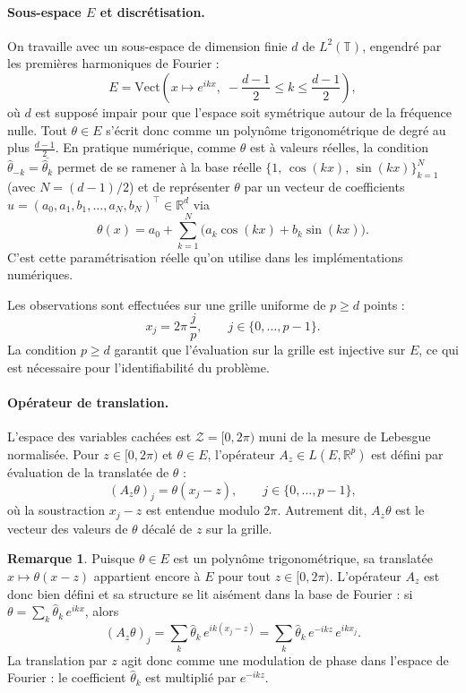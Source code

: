 \documentclass[12pt, a4paper]{article}
\theoremstyle{definition}
\newtheorem{remark}[theorem]{Remarque}
\newcommand{\R}{\mathbb{R}}
\newcommand{\Zcal}{\mathcal{Z}}
\begin{document}
\paragraph{Sous-espace $E$ et discrétisation.}
On travaille avec un sous-espace de dimension finie $d$ de $L^2(\mathbb{T})$,
engendré par les premières harmoniques de Fourier :
\[
    E = \mathrm{Vect}\!\left(x \mapsto e^{ikx},\;
    -\frac{d-1}{2} \leq k \leq \frac{d-1}{2}\right),
\]
où $d$ est supposé impair pour que l'espace soit symétrique autour de la fréquence
nulle. Tout $\theta \in E$ s'écrit donc comme un polynôme trigonométrique de degré
au plus $\frac{d-1}{2}$.
En pratique numérique, comme $\theta$ est à valeurs réelles, la condition
$\hat\theta_{-k} = \overline{\hat\theta_k}$ permet de se ramener à la base réelle
$\bigl\{1,\,\cos(kx),\,\sin(kx)\bigr\}_{k=1}^{N}$ (avec $N = (d-1)/2$) et de
représenter $\theta$ par un vecteur de coefficients
$u = (a_0, a_1, b_1, \ldots, a_N, b_N)^\top \in \R^d$ via
\[
    \theta(x) = a_0 + \sum_{k=1}^{N}\bigl(a_k\cos(kx) + b_k\sin(kx)\bigr).
\]
C'est cette paramétrisation réelle qu'on utilise dans les implémentations numériques.

Les observations sont effectuées sur une grille uniforme de $p \geq d$ points :
\[
    x_j = 2\pi\,\frac{j}{p}, \qquad j \in \{0, \ldots, p-1\}.
\]
La condition $p \geq d$ garantit que l'évaluation sur la grille est injective
sur $E$, ce qui est nécessaire pour l'identifiabilité du problème.

\paragraph{Opérateur de translation.}
L'espace des variables cachées est $\Zcal = [0, 2\pi)$ muni de la mesure de
Lebesgue normalisée. Pour $z \in [0, 2\pi)$ et $\theta \in E$, l'opérateur
$A_z \in L(E, \R^p)$ est défini par évaluation de la translatée de $\theta$ :
\[
    (A_z\theta)_j = \theta(x_j - z), \qquad j \in \{0, \ldots, p-1\},
\]
où la soustraction $x_j - z$ est entendue modulo $2\pi$. Autrement dit, $A_z\theta$
est le vecteur des valeurs de $\theta$ décalé de $z$ sur la grille.

\begin{remark}
    Puisque $\theta \in E$ est un polynôme trigonométrique, sa translatée
    $x \mapsto \theta(x - z)$ appartient encore à $E$ pour tout $z \in [0, 2\pi)$.
    L'opérateur $A_z$ est donc bien défini et sa structure se lit aisément dans la
    base de Fourier : si $\theta = \sum_k \hat{\theta}_k\, e^{ikx}$, alors
    \[
        (A_z\theta)_j = \sum_{k} \hat{\theta}_k\, e^{ik(x_j - z)}
        = \sum_{k} \hat{\theta}_k\, e^{-ikz}\, e^{ikx_j}.
    \]
    La translation par $z$ agit donc comme une modulation de phase dans l'espace de
    Fourier : le coefficient $\hat{\theta}_k$ est multiplié par $e^{-ikz}$.
\end{remark}
\end{document}
